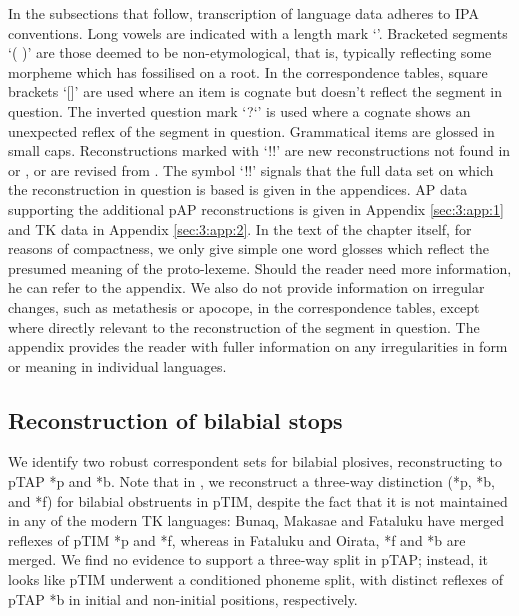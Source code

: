 In the subsections that follow, transcription of language data adheres to IPA conventions. Long vowels are indicated with a length mark `{\textlengthmark}'. Bracketed segments `( )' are those deemed to be non-etymological, that is, typically reflecting some morpheme which has fossilised on a root. In the correspondence tables, square brackets `[]' are used where an item is cognate but doesn't reflect the segment in question. The inverted question mark `?`' is used where a cognate shows an unexpected reflex of the segment in question. Grammatical items are glossed in small caps. Reconstructions marked with `!!' are new reconstructions not found in \citet{HoltonEtAl2012} or \citet{SchapperEtAl2012}, or are revised from \citet{HoltonEtAl2012}. The symbol `!!' signals that the full data set on which the reconstruction in question is based is given in the appendices. AP data supporting the additional pAP reconstructions is given in Appendix \ref{sec:3:app:1} and TK data in Appendix \ref{sec:3:app:2}. In the text of the chapter itself, for reasons of compactness, we only give simple one word glosses which reflect the presumed meaning of the proto-lexeme. Should the reader need more information, he can refer to the appendix. We also do not provide information on irregular changes, such as metathesis or apocope, in the correspondence tables, except where directly relevant to the reconstruction of the segment in question. The appendix provides the reader with fuller information on any irregularities in form or meaning in individual languages. 

\subsection{Reconstruction of bilabial stops}
We identify two robust correspondent sets for bilabial plosives, reconstructing to pTAP *p and *b. Note that in \citet{SchapperEtAl2012}, we reconstruct a three-way distinction (*p, *b, and *f) for bilabial obstruents in pTIM, despite the fact that it is not maintained in any of the modern TK languages: Bunaq, Makasae and Fataluku have merged reflexes of pTIM *p and *f, whereas in Fataluku and Oirata, *f and *b are merged. We find no evidence to support a three-way split in pTAP; instead, it looks like pTIM underwent a conditioned phoneme split, with distinct reflexes of pTAP *b in initial and non-initial positions, respectively. 

